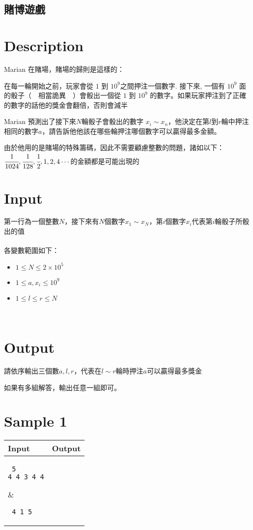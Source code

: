 \documentclass[11pt,a4paper]{article}
\begin{document}
\begin{center}
\section*{賭博遊戲}
\end{center}

\section*{Description}

Marian 在賭場，賭場的歸則是這樣的：

在每一輪開始之前，玩家會從 $1$ 到 $10^9$之間押注一個數字. 接下來, 一個有 $10^9$ 面的骰子（~~相當詭異~~）會骰出一個從 $1$ 到 $10^9$ 的數字。如果玩家押注到了正確的數字的話他的獎金會翻倍，否則會減半

Marian 預測出了接下來$N$輪骰子會骰出的數字 $x_i\sim x_n$，他決定在第$l$到$r$輪中押注相同的數字$a$，請告訴他他該在哪些輪押注哪個數字可以贏得最多金額。

由於他用的是賭場的特殊籌碼，因此不需要顧慮整數的問題，諸如以下：$\cfrac{1}{1024}, \cfrac{1}{128}, \cfrac{1}{2}, 1, 2, 4\cdots$的金額都是可能出現的
	
\section*{Input}

第一行為一個整數$N$，接下來有$N$個數字$x_1\sim x_N$，第$i$個數字$x_i$代表第$i$輪骰子所骰出的值
\\
\\
各變數範圍如下：
\begin{itemize}
    \item $1 \le N\le 2\times 10^5$
    \item $1\le a,x_i\le 10^9$
    \item $1\le l\le r\le N$
\end{itemize}\

\section*{Output}

請依序輸出三個數$a,l,r$，代表在$l\sim r$輪時押注$a$可以贏得最多獎金

如果有多組解答，輸出任意一組即可。

\section*{Sample 1}
\begin{longtable}[!h]{|p{}|p{}|}
\hline
\textbf {Input}	& \textbf {Output} \\
\hline
\parbox[t]{0.5\textwidth} %
{ \tt
5\\
4 4 3 4 4\\
} &
\parbox[t]{0.5\textwidth}
{ \tt
4 1 5\\
} \\
\hline
\end{longtable}
\end{document}
